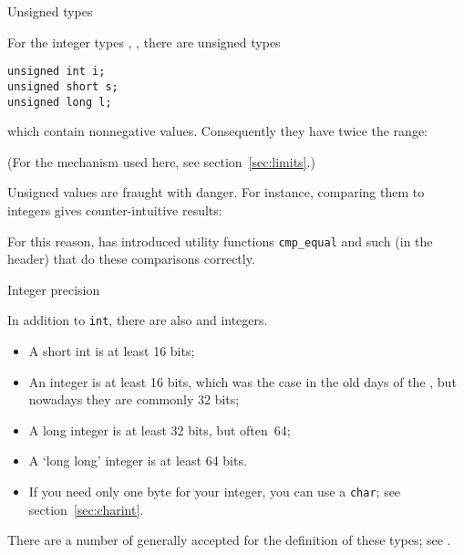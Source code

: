 
 {Unsigned types}
\label{sec:unsigned-cmp}

For the integer types , , 
there are unsigned types
\begin{lstlisting}
unsigned int i;
unsigned short s;
unsigned long l;
\end{lstlisting}
which contain nonnegative values.
Consequently they have twice the range:
%

(For the mechanism used here, see section~\ref{sec:limits}.)

Unsigned values are fraught with danger. For instance,
comparing them to integers gives counter-intuitive results:
%

For this reason,  has introduced utility functions
\lstinline+cmp_equal+ and such (in the  header)
that do these comparisons correctly.

 {Integer precision}
\label{sec:shortintlong}

In addition to \lstinline{int},
there are also  and  integers.

\begin{itemize}
\item A short int is at least 16 bits;
\item An integer is at least 16 bits, which was the case
  in the old days of the ,
  but nowadays they are commonly 32 bits;
\item A long integer is at least 32 bits, but often~64;
\item A `long long' integer is at least 64 bits.
\item If you need only one byte for your integer, you can use a \lstinline{char};
  see section~\ref{sec:charint}.
\end{itemize}

There are a number of generally accepted 
for the definition of these types; see .

